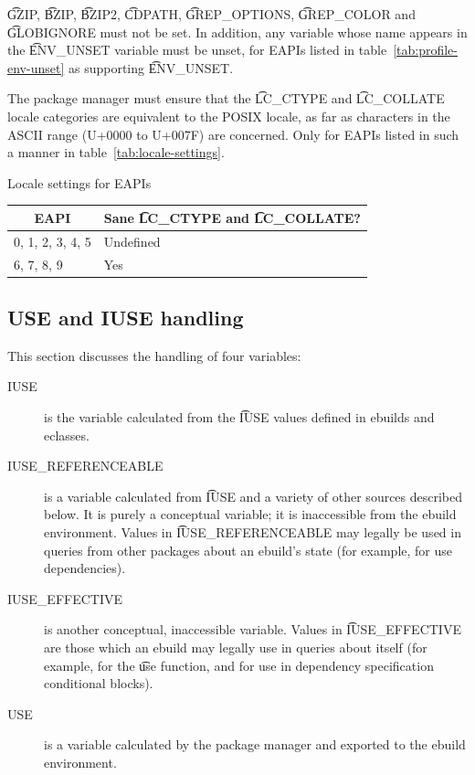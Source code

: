 \t{GZIP}, \t{BZIP}, \t{BZIP2}, \t{CDPATH}, \t{GREP_OPTIONS}, \t{GREP_COLOR} and \t{GLOBIGNORE}
must not be set.
 In addition, any variable whose name appears in the \t{ENV_UNSET} variable
must be unset, for EAPIs listed in table~\ref{tab:profile-env-unset} as supporting \t{ENV_UNSET}.

 The package manager must ensure that the \t{LC_CTYPE} and
\t{LC_COLLATE} locale categories are equivalent to the POSIX locale, as far as characters in the
ASCII range (U+0000 to U+007F) are concerned. Only for EAPIs listed in such a manner in
table~\ref{tab:locale-settings}.

\begin{centertable}{Locale settings for EAPIs}
    \label{tab:locale-settings}
    \begin{tabular}{ll}
      \toprule
      \multicolumn{1}{c}{\textbf{EAPI}} &
      \multicolumn{1}{c}{\textbf{Sane \t{LC_CTYPE} and \t{LC_COLLATE}?}} \\
      \midrule
      0, 1, 2, 3, 4, 5  & Undefined \\
      6, 7, 8, 9        & Yes       \\
      \bottomrule
    \end{tabular}
\end{centertable}

\subsection{USE and IUSE handling}
\label{sec:use-iuse-handling}

This section discusses the handling of four variables:
\nobreakpar
\begin{description}
\item[IUSE] is the variable calculated from the \t{IUSE} values defined in ebuilds and eclasses.
\item[IUSE_REFERENCEABLE] is a variable calculated from \t{IUSE} and a variety of other sources
    described below. It is purely a conceptual variable; it is inaccessible from the ebuild
    environment. Values in \t{IUSE_REFERENCEABLE} may legally be used in queries from other
    packages about an ebuild's state (for example, for use dependencies).
\item[IUSE_EFFECTIVE] is another conceptual, inaccessible variable. Values in \t{IUSE_EFFECTIVE}
    are those which an ebuild may legally use in queries about itself (for example, for the \t{use}
    function, and for use in dependency specification conditional blocks).
\item[USE] is a variable calculated by the package manager and exported to the ebuild environment.
\end{description}


